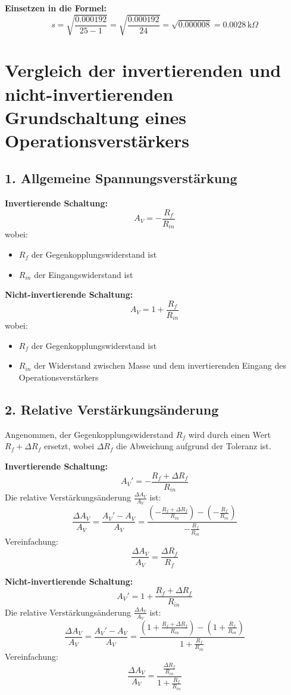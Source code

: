 \documentclass[a4paper,12pt]{article}
\begin{document}
\textbf{Einsetzen in die Formel:}
\[
s = \sqrt{\frac{0.000192}{25 - 1}} = \sqrt{\frac{0.000192}{24}} = \sqrt{0.000008} = 0.0028 \, \text{k}\Omega
\]
\section*{Vergleich der invertierenden und nicht-invertierenden Grundschaltung eines Operationsverstärkers}

\subsection*{1. Allgemeine Spannungsverstärkung}
\textbf{Invertierende Schaltung:}
\[
A_V = -\frac{R_f}{R_{in}}
\]
wobei:
\begin{itemize}
    \item \( R_f \) der Gegenkopplungswiderstand ist
    \item \( R_{in} \) der Eingangswiderstand ist
\end{itemize}

\textbf{Nicht-invertierende Schaltung:}
\[
A_V = 1 + \frac{R_f}{R_{in}}
\]
wobei:
\begin{itemize}
    \item \( R_f \) der Gegenkopplungswiderstand ist
    \item \( R_{in} \) der Widerstand zwischen Masse und dem invertierenden Eingang des Operationsverstärkers
\end{itemize}

\subsection*{2. Relative Verstärkungsänderung}
Angenommen, der Gegenkopplungswiderstand \( R_f \) wird durch einen Wert \( R_f + \Delta R_f \) ersetzt, wobei \( \Delta R_f \) die Abweichung aufgrund der Toleranz ist.

\textbf{Invertierende Schaltung:}
\[
A_V' = -\frac{R_f + \Delta R_f}{R_{in}}
\]
Die relative Verstärkungsänderung \( \frac{\Delta A_V}{A_V} \) ist:
\[
\frac{\Delta A_V}{A_V} = \frac{A_V' - A_V}{A_V} = \frac{\left( -\frac{R_f + \Delta R_f}{R_{in}} \right) - \left( -\frac{R_f}{R_{in}} \right)}{-\frac{R_f}{R_{in}}}
\]
Vereinfachung:
\[
\frac{\Delta A_V}{A_V} = \frac{\Delta R_f}{R_f}
\]

\textbf{Nicht-invertierende Schaltung:}
\[
A_V' = 1 + \frac{R_f + \Delta R_f}{R_{in}}
\]
Die relative Verstärkungsänderung \( \frac{\Delta A_V}{A_V} \) ist:
\[
\frac{\Delta A_V}{A_V} = \frac{A_V' - A_V}{A_V} = \frac{\left( 1 + \frac{R_f + \Delta R_f}{R_{in}} \right) - \left( 1 + \frac{R_f}{R_{in}} \right)}{1 + \frac{R_f}{R_{in}}}
\]
Vereinfachung:
\[
\frac{\Delta A_V}{A_V} = \frac{\frac{\Delta R_f}{R_{in}}}{1 + \frac{R_f}{R_{in}}}
\]
\end{document}
